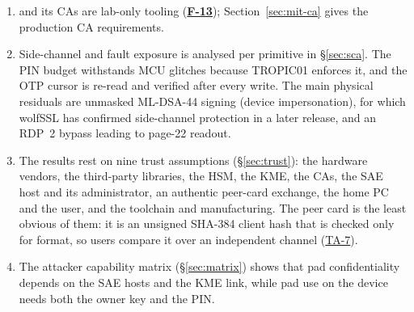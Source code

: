 \documentclass[11pt,a4paper]{article}
\newcommand{\fid}[1]{\textbf{#1}}
\begin{document}
\begin{enumerate}
\begin{itemize}
  \item the listener binds one configured address;
  \item call arguments, return values, and the registry stub pass allow-list serialization filters;
  \item the node does not start without a pin list.
  \end{itemize}
  The remaining RMI findings are Low or Info: unauthenticated handshake reachability, covered by a firewall allow-list (\hyperref[f:F-06]{\fid{F-06}}), and two accepted properties of the re-provision handover, the share deletion by a non-party (\hyperref[f:F-07]{\fid{F-07}}) and metadata readable by any pinned peer (\hyperref[f:F-14]{\fid{F-14}}).
\item {} and its CAs are lab-only tooling (\hyperref[f:F-13]{\fid{F-13}}); Section~\ref{sec:mit-ca} gives the production CA requirements.
\item Side-channel and fault exposure is analysed per primitive in \S\ref{sec:sca}. The PIN budget withstands MCU glitches because TROPIC01 enforces it, and the OTP cursor is re-read and verified after every write. The main physical residuals are unmasked ML-DSA-44 signing (device impersonation), for which wolfSSL has confirmed side-channel protection in a later release, and an RDP~2 bypass leading to page-22 readout.
\item The results rest on nine trust assumptions (\S\ref{sec:trust}): the hardware vendors, the third-party libraries, the HSM, the KME, the CAs, the SAE host and its administrator, an authentic peer-card exchange, the home PC and the user, and the toolchain and manufacturing. The peer card is the least obvious of them: it is an unsigned SHA-384 client hash that is checked only for format, so users compare it over an independent channel (\hyperref[ta:TA-7]{TA-7}).
\item The attacker capability matrix (\S\ref{sec:matrix}) shows that pad confidentiality depends on the SAE hosts and the KME link, while pad use on the device needs both the owner key and the PIN.
\end{enumerate}
\end{document}
